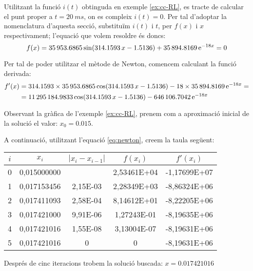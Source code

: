 \begin{exemple}
    Utilitzant la funció $i(t)$ obtinguda en exemple \vref{ex:cc-RL}, es tracte de calcular el punt proper a $t = \SI{20}{ms}$, on es compleix $i(t)=0$. Per tal d'adoptar la nomenclatura d'aquesta secció, substituïm $i(t)$ i $t$, per $f(x)$ i $x$ respectivament; l'equació que volem resoldre és doncs:
    \[
        f(x) = \num{35953,6865}\sin(\num{314,1593}\,x-\num{1,5136}) + \num{35894,8169}\,\mathrm{e}^{-18 x} = 0
    \]

    Per tal de poder utilitzar el mètode de Newton, comencem calculant la funció derivada:
    \begin{align*}
        f'(x) &= \num{314,1593}\times\num{35953,6865}\cos(\num{314,1593}\,x-\num{1,5136}) -18\times \num{35894,8169}\,\mathrm{e}^{-18 x}= \\
        {} &= \num{11295184,9833}\cos(\num{314,1593}\,x-\num{1,5136}) - \num{646106,7042}\,\mathrm{e}^{-18 x}
    \end{align*}

    Observant la gràfica de l'exemple \vref{ex:cc-RL}, prenem com a  aproximació inicial de la solució el valor: $x_0 = \num{0,015}$.

    A continuació, utilitzant l'equació \eqref{eq:newton}, creem la taula següent:

\begin{center}
   \centering
   \begin{tabular}{S[table-format=1.0]S[table-format=2.9]S[table-format=2.2e+2]
   S[table-format=2.5e+2]S[table-format=+3.5e+2]}
    & {$x_i$}  & {$|x_i - x_{i-1}|$} & {$f(x_i)$} & {$f'(x_i)$} \\
    &	0,015000000 &	{}       & 2,53461E+04	& -1,17699E+07 \\
        1 &	0,017153456 &	2,15E-03 & 2,28349E+03	& -8,86324E+06 \\	
        2 &	0,017411093 &	2,58E-04 & 8,14612E+01	& -8,22205E+06 \\	
        3 &	0,017421000 &	9,91E-06 & 1,27243E-01	& -8,19635E+06 \\	
        4 &	0,017421016 &	1,55E-08 & 3,13004E-07	& -8,19631E+06 \\	
        5 &	0,017421016 &	0        & 0           	& -8,19631E+06 \\	
   \bottomrule[1pt]
   \end{tabular}
\end{center}

Després de cinc iteracions trobem la solució buscada: $x=\num{0,017421016}$


\end{exemple}
